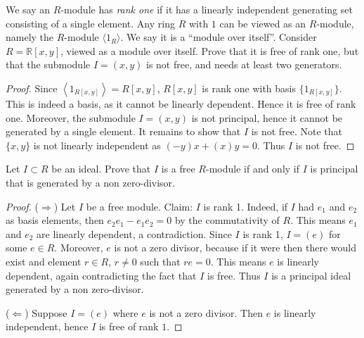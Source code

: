 \documentclass[10pt,oneside,openany]{memoir}
\begin{document}
\begin{exercise}
We say an $R$-module has \textit{rank one} if it has a linearly independent
generating set consisting of a single element. Any ring $R$ with $1$ can be
viewed as an $R$-module, namely the $R$-module $\langle 1_R\rangle$. We say
it is a ``module over itself''. Consider $R=\mathbb{R}[x,y]$, viewed as a
module over itself. Prove that it is free of rank one, but that the submodule
$I=(x,y)$ is not free, and needs at least two generators.
\end{exercise}
	{\color{blue} \begin{proof}
			Since $\left<1_{R[x,y]} \right> = R[x,y]$, $R[x,y]$ is rank one with basis $\{1_{R[x,y]}\}$. This is indeed a basis, as it cannot be linearly dependent. Hence it is free of rank one. Moreover, the submodule $I = (x,y)$ is not principal, hence it cannot be generated by a single element. It remains to show that $I$ is not free. Note that $\{x,y\}$ is not linearly independent as $(-y)x + (x)y = 0$. Thus $I$ is not free. 
	\end{proof}}

\begin{exercise}
Let $I\subset R$ be an ideal. Prove that $I$ is a free $R$-module if and only
if $I$ is principal that is generated by a non zero-divisor.
\end{exercise}
	{\color{blue}\begin{proof}
		($\Rightarrow$) Let $I$ be a free module. Claim: $I$ is rank 1. Indeed, if $I$ had $e_1$ and $e_2$ as basis elements, then $e_2e_1 - e_1e_2 = 0$ by the commutativity of $R$. This means $e_1$ and $e_2$ are linearly dependent, a contradiction. Since $I$ is rank 1, $I = (e)$ for some $e \in R$. Moreover, $e$ is not a zero divisor, because if it were then there would exist and element $r \in R$, $r \neq 0$ such that $re = 0$. This means $e$ is linearly dependent, again contradicting the fact that $I$ is free. Thus $I$ is a principal ideal generated by a non zero-divisor.

		($\Leftarrow$) Suppose $I = (e)$ where $e$ is not a zero divisor. Then $e$ is linearly independent, hence $I$ is free of rank $1$.
	\end{proof}}
\end{document}
